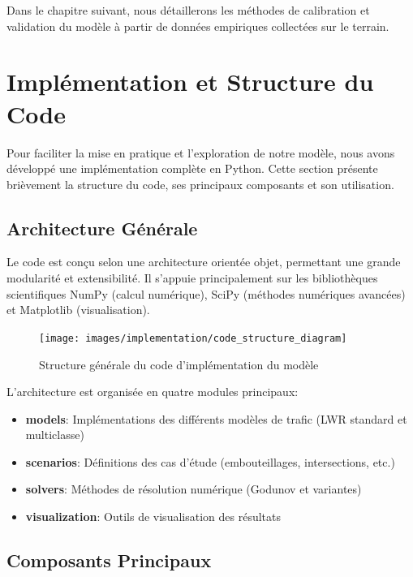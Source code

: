 Dans le chapitre suivant, nous détaillerons les méthodes de calibration et validation du modèle à partir de données empiriques collectées sur le terrain.

\section{Implémentation et Structure du Code}
\label{sec:implementation}

Pour faciliter la mise en pratique et l'exploration de notre modèle, nous avons développé une implémentation complète en Python. Cette section présente brièvement la structure du code, ses principaux composants et son utilisation.

\subsection{Architecture Générale}
\label{subsec:architecture}

Le code est conçu selon une architecture orientée objet, permettant une grande modularité et extensibilité. Il s'appuie principalement sur les bibliothèques scientifiques NumPy (calcul numérique), SciPy (méthodes numériques avancées) et Matplotlib (visualisation).

\begin{figure}[htbp]
\centering
\texttt{[image: images/implementation/code\_structure\_diagram]}
\caption{Structure générale du code d'implémentation du modèle}
\label{fig:code_structure}
\end{figure}

L'architecture est organisée en quatre modules principaux:
\begin{itemize}
\item \textbf{models}: Implémentations des différents modèles de trafic (LWR standard et multiclasse)
\item \textbf{scenarios}: Définitions des cas d'étude (embouteillages, intersections, etc.)
\item \textbf{solvers}: Méthodes de résolution numérique (Godunov et variantes)
\item \textbf{visualization}: Outils de visualisation des résultats
\end{itemize}

\subsection{Composants Principaux}
\label{subsec:composants}

